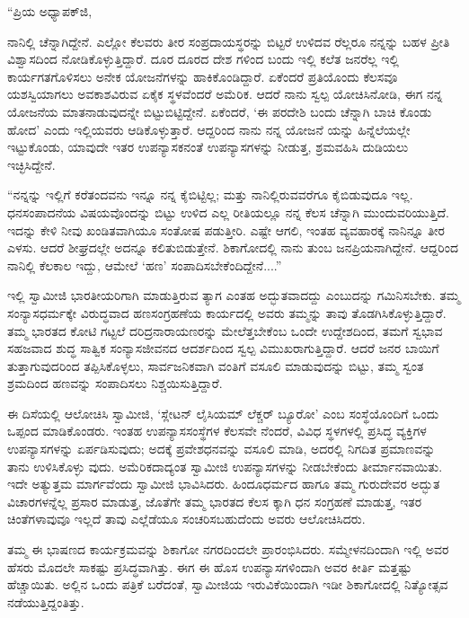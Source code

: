 “ಪ್ರಿಯ ಅಧ್ಯಾಪಕ್​ಜಿ,

ನಾನಿಲ್ಲಿ ಚೆನ್ನಾಗಿದ್ದೇನೆ. ಎಲ್ಲೋ ಕೆಲವರು ತೀರ ಸಂಪ್ರದಾಯಸ್ಥರನ್ನು ಬಿಟ್ಟರೆ ಉಳಿದವ ರೆಲ್ಲರೂ ನನ್ನನ್ನು ಬಹಳ ಪ್ರೀತಿ ವಿಶ್ವಾಸದಿಂದ ನೋಡಿಕೊಳ್ಳುತ್ತಿದ್ದಾರೆ. ದೂರ ದೂರದ ದೇಶ ಗಳಿಂದ ಬಂದು ಇಲ್ಲಿ ಕಲೆತ ಜನರೆಲ್ಲ ಇಲ್ಲಿ ಕಾರ್ಯಗತಗೊಳಿಸಲು ಅನೇಕ ಯೋಜನೆಗಳನ್ನು ಹಾಕಿಕೊಂಡಿದ್ದಾರೆ. ಏಕೆಂದರೆ ಪ್ರತಿಯೊಂದು ಕೆಲಸವೂ ಯಶಸ್ವಿಯಾಗಲು ಅವಕಾಶವಿರುವ ಏಕೈಕ ಸ್ಥಳವೆಂದರೆ ಅಮೆರಿಕ. ಆದರೆ ನಾನು ಸ್ವಲ್ಪ ಯೋಚಿಸಿನೋಡಿ, ಈಗ ನನ್ನ ಯೋಜನೆಯ ಮಾತನಾಡುವುದನ್ನೇ ಬಿಟ್ಟುಬಿಟ್ಟಿದ್ದೇನೆ. ಏಕೆಂದರೆ, ‘ಈ ಪರದೇಶಿ ಬಂದು ಚೆನ್ನಾಗಿ ಬಾಚಿ ಕೊಂಡು ಹೋದ’ ಎಂದು ಇಲ್ಲಿಯವರು ಆಡಿಕೊಳ್ಳುತ್ತಾರೆ. ಆದ್ದರಿಂದ ನಾನು ನನ್ನ ಯೋಜನೆ ಯನ್ನು ಹಿನ್ನೆಲೆಯಲ್ಲೇ ಇಟ್ಟುಕೊಂಡು, ಯಾವುದೇ ಇತರ ಉಪನ್ಯಾಸಕನಂತೆ ಉಪನ್ಯಾಸಗಳನ್ನು ನೀಡುತ್ತ, ಶ್ರಮವಹಿಸಿ ದುಡಿಯಲು ಇಚ್ಛಿಸಿದ್ದೇನೆ.

“ನನ್ನನ್ನು ಇಲ್ಲಿಗೆ ಕರೆತಂದವನು ಇನ್ನೂ ನನ್ನ ಕೈಬಿಟ್ಟಿಲ್ಲ; ಮತ್ತು ನಾನಿಲ್ಲಿರುವವರೆಗೂ ಕೈಬಿಡುವುದೂ ಇಲ್ಲ. ಧನಸಂಪಾದನೆಯ ವಿಷಯವೊಂದನ್ನು ಬಿಟ್ಟು ಉಳಿದ ಎಲ್ಲ ರೀತಿಯಲ್ಲೂ ನನ್ನ ಕೆಲಸ ಚೆನ್ನಾಗಿ ಮುಂದುವರಿಯುತ್ತಿದೆ. ಇದನ್ನು ಕೇಳಿ ನೀವು ಖಂಡಿತವಾಗಿಯೂ ಸಂತೋಷ ಪಡುತ್ತೀರಿ. ಎಷ್ಟೇ ಆಗಲಿ, ಇಂತಹ ವ್ಯವಹಾರಕ್ಕೆ ನಾನಿನ್ನೂ ತೀರ ಎಳಸು. ಆದರೆ ಶೀಘ್ರದಲ್ಲೇ ಅದನ್ನೂ ಕಲಿತುಬಿಡುತ್ತೇನೆ. ಶಿಕಾಗೋದಲ್ಲಿ ನಾನು ತುಂಬ ಜನಪ್ರಿಯನಾಗಿದ್ದೇನೆ. ಆದ್ದರಿಂದ ನಾನಿಲ್ಲಿ ಕೆಲಕಾಲ ಇದ್ದು, ಆಮೇಲೆ ‘ಹಣ’ ಸಂಪಾದಿಸಬೇಕೆಂದಿದ್ದೇನೆ....”

ಇಲ್ಲಿ ಸ್ವಾಮೀಜಿ ಭಾರತೀಯರಿಗಾಗಿ ಮಾಡುತ್ತಿರುವ ತ್ಯಾಗ ಎಂತಹ ಅದ್ಭುತವಾದದ್ದು ಎಂಬುದನ್ನು ಗಮಿನಿಸಬೇಕು. ತಮ್ಮ ಸಂನ್ಯಾಸಧರ್ಮಕ್ಕೇ ವಿರುದ್ಧವಾದ ಹಣಸಂಗ್ರಹಣೆಯ ಕಾರ್ಯದಲ್ಲಿ ಅವರು ತಮ್ಮನ್ನು ತಾವು ತೊಡಗಿಸಿಕೊಳ್ಳುತ್ತಿದ್ದಾರೆ. ತಮ್ಮ ಭಾರತದ ಕೋಟಿ ಗಟ್ಟಲೆ ದರಿದ್ರನಾರಾಯಣರನ್ನು ಮೇಲೆತ್ತಬೇಕೆಂಬ ಒಂದೇ ಉದ್ದೇಶದಿಂದ, ತಮಗೆ ಸ್ವಭಾವ ಸಹಜವಾದ ಶುದ್ಧ ಸಾತ್ವಿಕ ಸಂನ್ಯಾಸಜೀವನದ ಆದರ್ಶದಿಂದ ಸ್ವಲ್ಪ ವಿಮುಖರಾಗುತ್ತಿದ್ದಾರೆ. ಆದರೆ ಜನರ ಬಾಯಿಗೆ ತುತ್ತಾಗುವುದರಿಂದ ತಪ್ಪಿಸಿಕೊಳ್ಳಲು, ಸಾರ್ವಜನಿಕವಾಗಿ ವಂತಿಗೆ ವಸೂಲಿ ಮಾಡುವುದನ್ನು ಬಿಟ್ಟು, ತಮ್ಮ ಸ್ವಂತ ಶ್ರಮದಿಂದ ಹಣವನ್ನು ಸಂಪಾದಿಸಲು ನಿಶ್ಚಯಿಸುತ್ತಿದ್ದಾರೆ.

ಈ ದಿಸೆಯಲ್ಲಿ ಆಲೋಚಿಸಿ ಸ್ವಾಮೀಜಿ, ‘ಸ್ಲೇಟನ್ ಲೈಸಿಯಮ್ ಲೆಕ್ಚರ್ ಬ್ಯೂರೋ’ ಎಂಬ ಸಂಸ್ಥೆಯೊಂದಿಗೆ ಒಂದು ಒಪ್ಪಂದ ಮಾಡಿಕೊಂಡರು. ಇಂತಹ ಉಪನ್ಯಾಸಸಂಸ್ಥೆಗಳ ಕೆಲಸವೇ ನೆಂದರೆ, ವಿವಿಧ ಸ್ಥಳಗಳಲ್ಲಿ ಪ್ರಸಿದ್ಧ ವ್ಯಕ್ತಿಗಳ ಉಪನ್ಯಾಸಗಳನ್ನು ಏರ್ಪಡಿಸುವುದು; ಅದಕ್ಕೆ ಪ್ರವೇಶಧನವನ್ನು ವಸೂಲಿ ಮಾಡಿ, ಅದರಲ್ಲಿ ನಿಗದಿತ ಪ್ರಮಾಣವನ್ನು ತಾನು ಉಳಿಸಿಕೊಳ್ಳು ವುದು. ಅಮೆರಿಕದಾದ್ಯಂತ ಸ್ವಾಮೀಜಿ ಉಪನ್ಯಾಸಗಳನ್ನು ನೀಡಬೇಕೆಂದು ತೀರ್ಮಾನವಾಯಿತು. ಇದೇ ಅತ್ಯುತ್ತಮ ಮಾರ್ಗವೆಂದು ಸ್ವಾಮೀಜಿ ಭಾವಿಸಿದರು. ಹಿಂದೂಧರ್ಮದ ಹಾಗೂ ತಮ್ಮ ಗುರುದೇವರ ಅದ್ಭುತ ವಿಚಾರಗಳನ್ನೆಲ್ಲ ಪ್ರಸಾರ ಮಾಡುತ್ತ, ಜೊತೆಗೇ ತಮ್ಮ ಭಾರತದ ಕೆಲಸ ಕ್ಕಾಗಿ ಧನ ಸಂಗ್ರಹಣೆ ಮಾಡುತ್ತ, ಇತರ ಚಿಂತೆಗಳಾವುವೂ ಇಲ್ಲದೆ ತಾವು ಎಲ್ಲೆಡೆಯೂ ಸಂಚರಿಸಬಹುದೆಂದು ಅವರು ಆಲೋಚಿಸಿದರು.

ತಮ್ಮ ಈ ಭಾಷಣದ ಕಾರ್ಯಕ್ರಮವನ್ನು ಶಿಕಾಗೋ ನಗರದಿಂದಲೇ ಪ್ರಾರಂಭಿಸಿದರು. ಸಮ್ಮೇಳನದಿಂದಾಗಿ ಇಲ್ಲಿ ಅವರ ಹೆಸರು ಮೊದಲೇ ಸಾಕಷ್ಟು ಪ್ರಸಿದ್ಧವಾಗಿತ್ತು. ಈಗ ಈ ಹೊಸ ಉಪನ್ಯಾಸಗಳಿಂದಾಗಿ ಅವರ ಕೀರ್ತಿ ಮತ್ತಷ್ಟು ಹೆಚ್ಚಾಯಿತು. ಅಲ್ಲಿನ ಒಂದು ಪತ್ರಿಕೆ ಬರೆದಂತೆ, ಸ್ವಾಮೀಜಿಯ ಇರುವಿಕೆಯಿಂದಾಗಿ ಇಡೀ ಶಿಕಾಗೋದಲ್ಲಿ ನಿತ್ಯೋತ್ಸವ ನಡೆಯುತ್ತಿದ್ದಂತಿತ್ತು.

